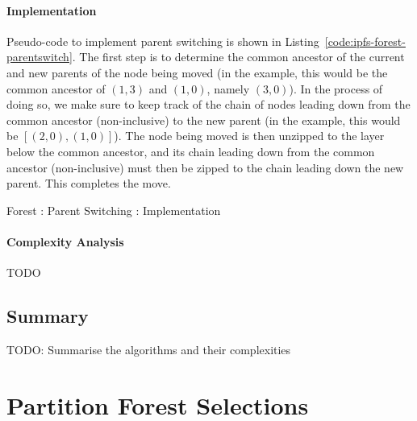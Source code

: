 \paragraph{Implementation}

Pseudo-code to implement parent switching is shown in Listing~\ref{code:ipfs-forest-parentswitch}. The first step is to determine the common ancestor of the current and new parents of the node being moved (in the example, this would be the common ancestor of $(1,3)$ and $(1,0)$, namely $(3,0)$). In the process of doing so, we make sure to keep track of the chain of nodes leading down from the common ancestor (non-inclusive) to the new parent (in the example, this would be $[(2,0), (1,0)]$). The node being moved is then unzipped to the layer below the common ancestor, and its chain leading down from the common ancestor (non-inclusive) must then be zipped to the chain leading down the new parent. This completes the move.

\begin{stulisting}[p]
\caption{Forest : Parent Switching : Implementation}
\label{code:ipfs-forest-parentswitch}

\end{stulisting}

\paragraph{Complexity Analysis}

TODO

\afterpage{\clearpage}
\newpage

\subsection{Summary}

TODO: Summarise the algorithms and their complexities

\newpage

\section{Partition Forest Selections}
\label{sec:ipfs-selections}

